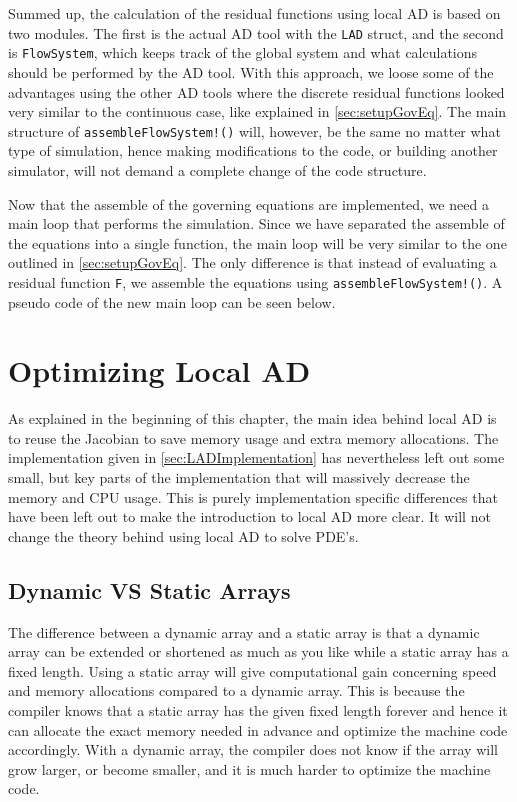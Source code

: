 Summed up, the calculation of the residual functions using local AD is based on two modules. The first is the actual AD tool with the \texttt{LAD} struct, and the second is \texttt{FlowSystem}, which keeps track of the global system and what calculations should be performed by the AD tool. With this approach, we loose some of the advantages using the other AD tools where the discrete residual functions looked very similar to the continuous case, like explained in \autoref{sec:setupGovEq}. The main structure of \texttt{assembleFlowSystem!()} will, however, be the same no matter what type of simulation, hence making modifications to the code, or building another simulator, will not demand a complete change of the code structure.

Now that the assemble of the governing equations are implemented, we need a main loop that performs the simulation. Since we have separated the assemble of the equations into a single function, the main loop will be very similar to the one outlined in \autoref{sec:setupGovEq}. The only difference is that instead of evaluating a residual function \texttt{F}, we assemble the equations using \texttt{assembleFlowSystem!()}. A pseudo code of the new main loop can be seen below. 


\section{Optimizing Local AD}
\label{sec:optimizingLocalAD}
As explained in the beginning of this chapter, the main idea behind local AD is to reuse the Jacobian to save memory usage and extra memory allocations. The implementation given in \autoref{sec:LADImplementation} has nevertheless left out some small, but key parts of the implementation that will massively decrease the memory and CPU usage. This is purely implementation specific differences that have been left out to make the introduction to local AD more clear. It will not change the theory behind using local AD to solve PDE's.

\subsection{Dynamic VS Static Arrays}
The difference between a dynamic array and a static array is that a dynamic array can be extended or shortened as much as you like while a static array has a fixed length. Using a static array will give computational gain concerning speed and memory allocations compared to a dynamic array. This is because the compiler knows that a static array has the given fixed length forever and hence it can allocate the exact memory needed in advance and optimize the machine code accordingly. With a dynamic array, the compiler does not know if the array will grow larger, or become smaller, and it is much harder to optimize the machine code. 

